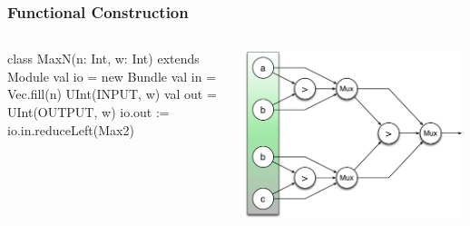 \documentclass[xcolor=pdflatex,dvipsnames,table]{beamer}
\begin{document}
\begin{frame}[fragile]
\frametitle{Functional Construction}

\begin{columns}


{
\begin{scala}
class MaxN(n: Int, w: Int) extends Module {
  val io = new Bundle {
    val in  = Vec.fill(n){ UInt(INPUT, w) }
    val out = UInt(OUTPUT, w)
  }
  io.out := io.in.reduceLeft(Max2)
}
\end{scala}
}


\begin{center}
\includegraphics[width=0.99\textwidth]{figs/reduceMax.pdf} \\
\end{center}

\end{columns}

\end{frame}
\end{document}
